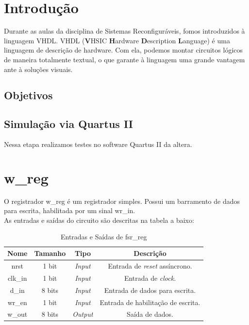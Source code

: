 \documentclass{article}
\begin{document}


\newpage
\thispagestyle{empty}
\tableofcontents

\newpage
\large %

\section{Introdução}

Durante as aulas da disciplina de Sistemas Reconfiguráveis, fomos introduzidos à linguagem VHDL. VHDL (\textbf{V}HSIC \textbf{H}ardware \textbf{D}escription \textbf{L}anguage) é uma linguagem de descrição de hardware. Com ela, podemos montar circuitos lógicos de maneira totalmente textual, o que garante à linguagem uma grande vantagem ante à soluções visuais.

\subsection{Objetivos}

\subsection{Simulação via Quartus II}

Nessa etapa realizamos testes no software Quartus II da altera.

\section{w\_reg}

O registrador w\_reg é um registrador simples. Possui um barramento de dados para escrita, habilitada por um sinal wr\_in.\\

As entradas e saídas do circuito são descritas na tabela a baixo:\\

\begin{table}[ht]
    \begin{center}
        \begin{tabular}{|c|c|c|c|}
            \hline
            Nome & Tamanho & Tipo & Descrição\\
            \hline
            nrst & 1 bit & \textit{Input} & Entrada de \textit{reset} assíncrono.\\
            \hline
            clk\_in & 1 bit & \textit{Input} & Entrada de \textit{clock}.\\
            \hline
            d\_in & 8 bits & \textit{Input} & Entrada de dados para escrita.\\
            \hline
            wr\_en & 1 bit & \textit{Input} & Entrada de habilitação de escrita.\\
            \hline
            w\_out & 8 bits & \textit{Output} & Saída de dados.\\
            \hline
        \end{tabular}
    \end{center}
    \caption{Entradas e Saídas de fsr\_reg}
\end{table}
\end{document}
